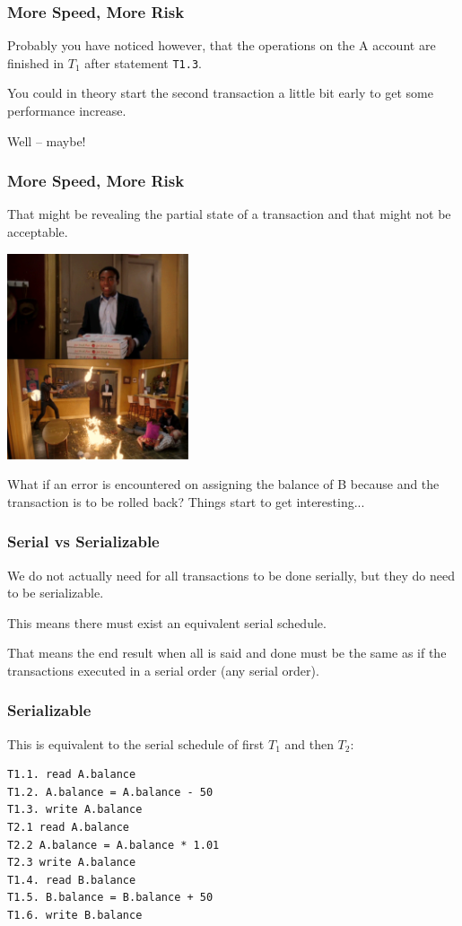 \begin{frame}
\frametitle{More Speed, More Risk}

Probably you have noticed however, that the operations on the A account are finished in $T_{1}$ after statement \texttt{T1.3}. 

You could in theory start the second transaction a little bit early to get some performance increase. 

Well -- maybe! 

\end{frame}

\begin{frame}
\frametitle{More Speed, More Risk}

That might be revealing the partial state of a transaction and that might not be acceptable. 

\begin{center}
	\includegraphics[width=0.4\textwidth]{images/troy.png}
\end{center}

What if an error is encountered on assigning the balance of B because and the transaction is to be rolled back? Things start to get interesting...


\end{frame}

\begin{frame}
\frametitle{Serial vs Serializable}

We do not actually need for all transactions to be done serially, but they do need to be \alert{serializable}.

This means there must exist an equivalent serial schedule.

That means the end result when all is said and done must be the same as if the transactions executed in a serial order (any serial order).

\end{frame}


\begin{frame}[fragile]
\frametitle{Serializable}

This is equivalent to the serial schedule of first $T_{1}$ and then $T_{2}$:

\begin{verbatim}
T1.1. read A.balance
T1.2. A.balance = A.balance - 50
T1.3. write A.balance
T2.1 read A.balance
T2.2 A.balance = A.balance * 1.01
T2.3 write A.balance
T1.4. read B.balance
T1.5. B.balance = B.balance + 50
T1.6. write B.balance
\end{verbatim}

\end{frame}


